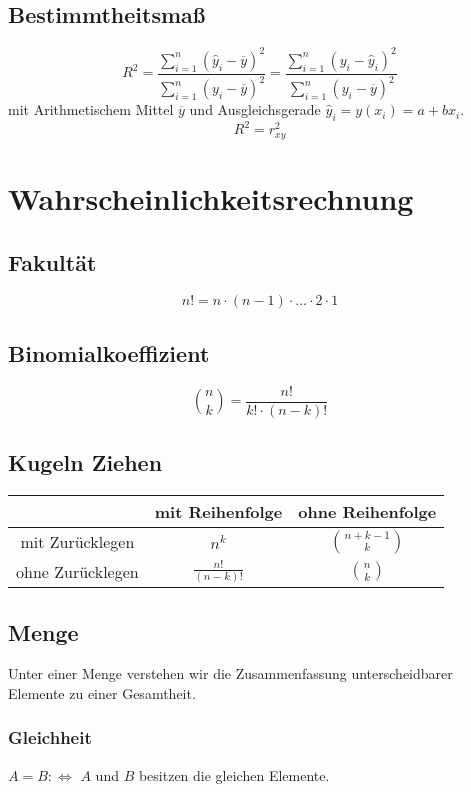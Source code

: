 \documentclass[12pt]{article}
\begin{document}
\subsection{Bestimmtheitsmaß}
\begin{equation*}
	R^2 = \frac{\sum_{i=1}^n (\hat{y}_i-\overline{y})^2}{\sum_{i=1}^n (y_i-\overline{y})^2} = \frac{\sum_{i=1}^n (y_i - \hat{y}_i)^2}{\sum_{i=1}^n (y_i-\overline{y})^2}
\end{equation*}
mit Arithmetischem Mittel $\overline{y}$ und Ausgleichsgerade $\hat{y}_i = y(x_i) = a+bx_i$.
\begin{equation*}
	R^2 = r_{xy}^2
\end{equation*}

\section{Wahrscheinlichkeitsrechnung}
\subsection{Fakultät}
\begin{equation*}
	n! = n \cdot (n-1) \cdot \dotsc \cdot 2 \cdot 1 
\end{equation*}
\subsection{Binomialkoeffizient}
\begin{equation*}
	{n \choose k} = \frac{n!}{k!\cdot(n-k)!}
\end{equation*}
\subsection{Kugeln Ziehen}
\begin{tabular}{c|c|c}
	 & mit Reihenfolge & ohne Reihenfolge 
	 \\\hline
	 mit Zurücklegen & $n^k$ & ${n+k-1 \choose k}$
	 \\\hline
	 ohne Zurücklegen & $\frac{n!}{(n-k)!}$ & ${n \choose k}$
\end{tabular}
\subsection{Menge}
Unter einer Menge verstehen wir die Zusammenfassung unterscheidbarer Elemente zu einer Gesamtheit.
\subsubsection{Gleichheit}
$A = B:\Leftrightarrow$ $A$ und $B$ besitzen die gleichen Elemente.
\end{document}
